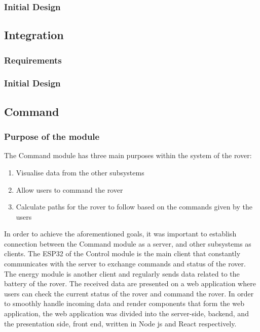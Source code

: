 \documentclass[a4paper]{article}
\begin{document}
\subsubsection{Initial Design}


\subsection{Integration}
\subsubsection{Requirements}
\subsubsection{Initial Design}
\subsection{Command}

\subsubsection{Purpose of the module}

The Command module has three main purposes within the system of the rover:

\begin{enumerate}
    \item Visualise data from the other subsystems
    \item Allow users to command the rover
    \item Calculate paths for the rover to follow based on the commands given by the users
\end{enumerate}

In order to achieve the aforementioned goals, it was important to establish connection between the Command 
module as a server, and other subsystems as clients. The ESP32 of the Control module is the main client 
that constantly communicates with the server to exchange commands and status of the rover. The energy module 
is another client and regularly sends data related to the battery of the rover. The received data are presented 
on a web application where users can check the current status of the rover and command the rover. In order to 
smoothly handle incoming data and render components that form the web application, the web application was divided 
into the server-side, backend, and the presentation side, front end, written in Node js and React respectively.
\end{document}
